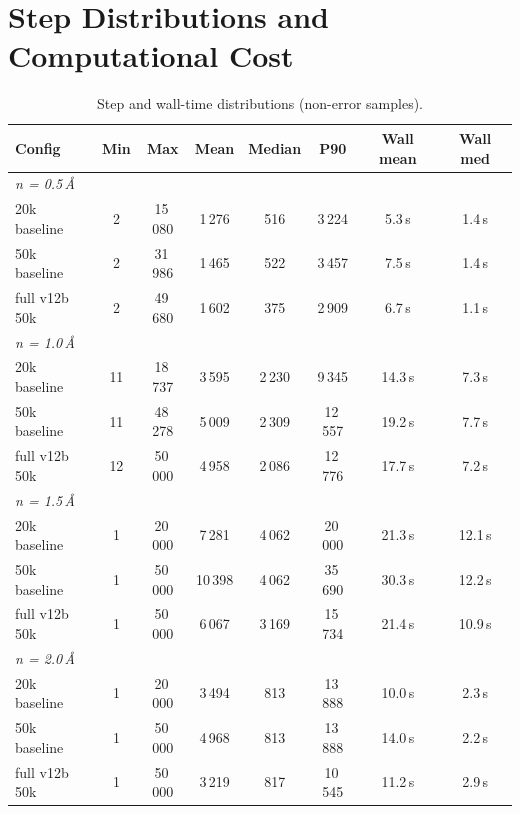 \documentclass[11pt,a4paper]{article}
\theoremstyle{definition}
\begin{document}
\section{Step Distributions and Computational Cost}
\label{app:steps}

\begin{table}[h]
\centering\small
\caption{Step and wall-time distributions (non-error samples).}
\begin{tabular}{lccccccc}
\toprule
Config & Min & Max & Mean & Median & P90 & Wall mean & Wall med \\
\midrule
\multicolumn{8}{l}{\textit{n = 0.5\,\AA}} \\
\quad 20k baseline    & 2 & 15\,080 & 1\,276 & 516 & 3\,224 & 5.3\,s & 1.4\,s \\
\quad 50k baseline    & 2 & 31\,986 & 1\,465 & 522 & 3\,457 & 7.5\,s & 1.4\,s \\
\quad full v12b 50k   & 2 & 49\,680 & 1\,602 & 375 & 2\,909 & 6.7\,s & 1.1\,s \\
\midrule
\multicolumn{8}{l}{\textit{n = 1.0\,\AA}} \\
\quad 20k baseline    & 11 & 18\,737 & 3\,595 & 2\,230 & 9\,345 & 14.3\,s & 7.3\,s \\
\quad 50k baseline    & 11 & 48\,278 & 5\,009 & 2\,309 & 12\,557 & 19.2\,s & 7.7\,s \\
\quad full v12b 50k   & 12 & 50\,000 & 4\,958 & 2\,086 & 12\,776 & 17.7\,s & 7.2\,s \\
\midrule
\multicolumn{8}{l}{\textit{n = 1.5\,\AA}} \\
\quad 20k baseline    & 1 & 20\,000 & 7\,281 & 4\,062 & 20\,000 & 21.3\,s & 12.1\,s \\
\quad 50k baseline    & 1 & 50\,000 & 10\,398 & 4\,062 & 35\,690 & 30.3\,s & 12.2\,s \\
\quad full v12b 50k   & 1 & 50\,000 & 6\,067 & 3\,169 & 15\,734 & 21.4\,s & 10.9\,s \\
\midrule
\multicolumn{8}{l}{\textit{n = 2.0\,\AA}} \\
\quad 20k baseline    & 1 & 20\,000 & 3\,494 & 813 & 13\,888 & 10.0\,s & 2.3\,s \\
\quad 50k baseline    & 1 & 50\,000 & 4\,968 & 813 & 13\,888 & 14.0\,s & 2.2\,s \\
\quad full v12b 50k   & 1 & 50\,000 & 3\,219 & 817 & 10\,545 & 11.2\,s & 2.9\,s \\
\bottomrule
\end{tabular}
\end{table}
\end{document}
